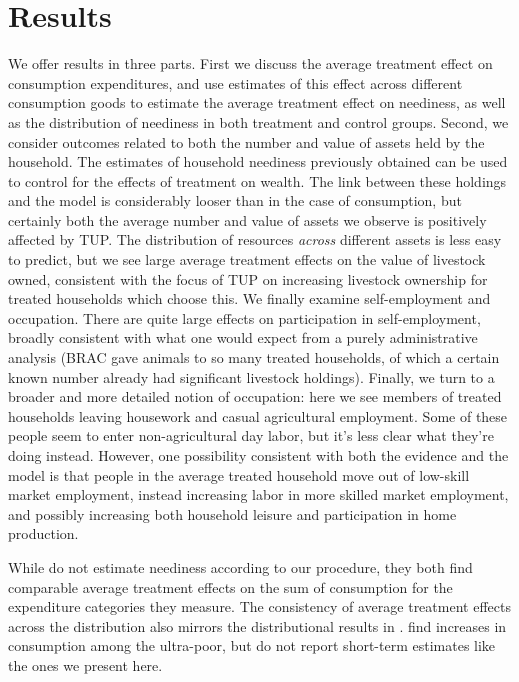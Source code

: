 \documentclass[11pt]{article}
\begin{document}
\section*{Results}
\label{sec-8}

We offer results in three parts.  First we discuss the average
treatment effect on consumption expenditures, and use estimates of
this effect across different consumption goods to estimate the average
treatment effect on neediness, as well as the distribution of
neediness in both treatment and control groups.  Second, we consider
outcomes related to both the number and value of assets held by the
household.  The estimates of household neediness previously obtained
can be used to control for the effects of treatment on wealth.  The
link between these holdings and the model is considerably looser than
in the case of consumption, but certainly both the average number and
value of assets we observe is positively affected by TUP.  The
distribution of resources \emph{across} different assets is less easy to
predict, but we see large average treatment effects on the value of
livestock owned, consistent with the focus of TUP on increasing
livestock ownership for treated households which choose this.  We
finally examine self-employment and occupation.  There are quite large
effects on participation in self-employment, broadly consistent with
what one would expect from a purely administrative analysis (BRAC gave
animals to so many treated households, of which a certain known number
already had significant livestock holdings).  Finally, we turn to a
broader and more detailed notion of occupation: here we see members of
treated households leaving housework and casual agricultural
employment.  Some of these people seem to enter non-agricultural day
labor, but it's less clear what they're doing instead.  However, one
possibility consistent with both the evidence and the model is that
people in the average treated household move out of low-skill market
employment, instead increasing labor in more skilled market
employment, and possibly increasing both household leisure and
participation in home production.

While \cite{banerjee2015} do not estimate neediness according to our procedure,
they both find comparable average treatment effects on the sum of 
consumption for the expenditure categories they measure. The consistency of average
treatment effects across the distribution also mirrors the distributional results in
\cite{banerjee2015}. \cite{bandiera2017} find increases in consumption among
the ultra-poor, but do not report short-term estimates like the ones we present here.
\end{document}
